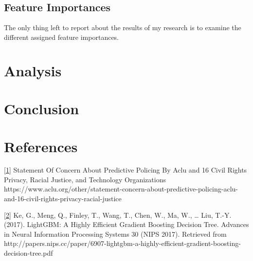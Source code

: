 \documentclass[11pt]{article}
\begin{document}
    \hypertarget{feature-importances}{%
\subsection{Feature Importances}\label{feature-importances}}

The only thing left to report about the results of my research is to
examine the different assigned feature importances.

    \hypertarget{analysis}{%
\section{Analysis}\label{analysis}}

\hypertarget{conclusion}{%
\section{Conclusion}\label{conclusion}}

\hypertarget{references}{%
\section{References}\label{references}}

\href{https://www.aclu.org/other/statement-concern-about-predictive-policing-aclu-and-16-civil-rights-privacy-racial-justice}{{[}1{]}}
Statement Of Concern About Predictive Policing By Aclu and 16 Civil
Rights Privacy, Racial Justice, and Technology Organizations
https://www.aclu.org/other/statement-concern-about-predictive-policing-aclu-and-16-civil-rights-privacy-racial-justice

\href{http://papers.nips.cc/paper/6907-lightgbm-a-highly-efficient-gradient-boosting-decision-tree.pdf}{{[}2{]}}
Ke, G., Meng, Q., Finley, T., Wang, T., Chen, W., Ma, W., \ldots{} Liu,
T.-Y. (2017). LightGBM: A Highly Efficient Gradient Boosting Decision
Tree. Advances in Neural Information Processing Systems 30 (NIPS 2017).
Retrieved from
http://papers.nips.cc/paper/6907-lightgbm-a-highly-efficient-gradient-boosting-decision-tree.pdf


    
    
    
    
\end{document}
